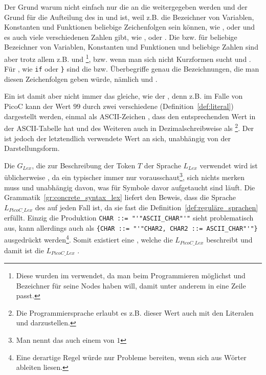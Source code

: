 Der Grund warum nicht einfach nur die  an die  weitergegeben werden und der Grund für die Aufteilung des  in  und  ist, weil z.B. die Bezeichner von Variablen, Konstanten und Funktionen beliebige Zeichenfolgen sein können, wie ,  oder  und es auch viele verschiedenen Zahlen gibt, wie ,  oder . Die  bzw.  für beliebige Bezeichner von Variablen, Konstanten und Funktionen und beliebige Zahlen sind aber trotz allem z.B.  und \footnote{Diese  wurden im   verwendet, da man beim Programmieren möglichst  und  Bezeichner für seine Nodes haben will, damit unter anderem  in eine Zeile passt.}, bzw. wenn man sich nicht Kurzformen sucht  und . Für , wie \verb|if| oder \verb|}| sind die  bzw. Überbegriffe genau die Bezeichnungen, die man diesen Zeichenfolgen geben würde, nämlich  und .

Ein  ist damit aber nicht immer das gleiche, wie der , denn z.B. im Falle von PicoC kann der Wert $99$ durch zwei verschiedene  (Definition~\ref{def:literal}) dargestellt werden, einmal als ASCII-Zeichen , dass den entsprechenden Wert in der ASCII-Tabelle hat und des Weiteren auch in Dezimalschreibweise als \footnote{Die Programmiersprache  erlaubt es z.B. dieser Wert auch mit den Literalen  und  darzustellen.}. Der  ist jedoch der letztendlich verwendete Wert an sich, unabhängig von der Darstellungsform.

Die  $G_{Lex}$, die zur Beschreibung der Token $T$ der Sprache $L_{Lex}$ verwendet wird ist üblicherweise , da ein typischer  immer nur  vorausschaut\footnote{Man nennt das auch einem  von $1$}, sich nichts merken muss und unabhängig davon, was für Symbole davor aufgetaucht sind läuft. Die Grammatik~\ref{gr:concrete_syntax_lex} liefert den Beweis, dass die Sprache $L_{PicoC\_Lex}$ des  auf jeden Fall  ist, da sie fast die Definition~\ref{def:reguläre_sprachen} erfüllt. Einzig die Produktion \verb|CHAR ::= "'"ASCII_CHAR"'"| sieht problematisch aus, kann allerdings auch als \verb|{CHAR ::= "'"CHAR2, CHAR2 ::= ASCII_CHAR"'"}|  ausgedrückt werden\footnote{Eine derartige Regel würde nur Probleme bereiten, wenn sich aus   Wörter ableiten liesen.}. Somit existiert eine , welche die  $L_{PicoC\_Lex}$ beschreibt und damit ist die  $L_{PicoC\_Lex}$ .

